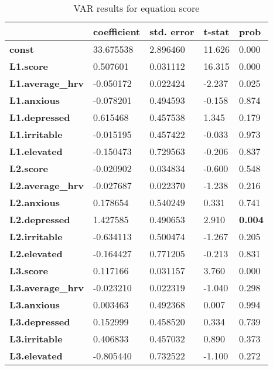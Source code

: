 \documentclass{article}
\begin{document}
\begin{table}[!ht]
    \centering
    \begin{tabular}{lllll}
      \toprule\
        ~ & \textbf{coefficient} & \textbf{std. error} & \textbf{t-stat} & \textbf{prob} \\ \midrule
        \textbf{const} & 33.675538 & 2.896460 & 11.626 & 0.000 \\ 
        \textbf{L1.score} & 0.507601 & 0.031112 & 16.315 & 0.000 \\ 
        \textbf{L1.average\_hrv} & -0.050172 & 0.022424 & -2.237 & 0.025 \\ 
        \textbf{L1.anxious} & -0.078201 & 0.494593 & -0.158 & 0.874 \\ 
        \textbf{L1.depressed} & 0.615468 & 0.457538 & 1.345 & 0.179 \\ 
        \textbf{L1.irritable} & -0.015195 & 0.457422 & -0.033 & 0.973 \\ 
        \textbf{L1.elevated} & -0.150473 & 0.729563 & -0.206 & 0.837 \\ 
        \textbf{L2.score} & -0.020902 & 0.034834 & -0.600 & 0.548 \\ 
        \textbf{L2.average\_hrv} & -0.027687 & 0.022370 & -1.238 & 0.216 \\ 
        \textbf{L2.anxious} & 0.178654 & 0.540249 & 0.331 & 0.741 \\ 
        \textbf{L2.depressed} & 1.427585 & 0.490653 & 2.910 & \textbf{0.004} \\ 
        \textbf{L2.irritable} & -0.634113 & 0.500474 & -1.267 & 0.205 \\ 
        \textbf{L2.elevated} & -0.164427 & 0.771205 & -0.213 & 0.831 \\ 
        \textbf{L3.score} & 0.117166 & 0.031157 & 3.760 & 0.000 \\ 
        \textbf{L3.average\_hrv} & -0.023210 & 0.022319 & -1.040 & 0.298 \\ 
        \textbf{L3.anxious} & 0.003463 & 0.492368 & 0.007 & 0.994 \\ 
        \textbf{L3.depressed} & 0.152999 & 0.458520 & 0.334 & 0.739 \\ 
        \textbf{L3.irritable} & 0.406833 & 0.457032 & 0.890 & 0.373 \\ 
        \textbf{L3.elevated} & -0.805440 & 0.732522 & -1.100 & 0.272 \\ \bottomrule
    \end{tabular}
    \caption{VAR results for equation score}
    \label{VAR Score Results}
\end{table}
\end{document}
